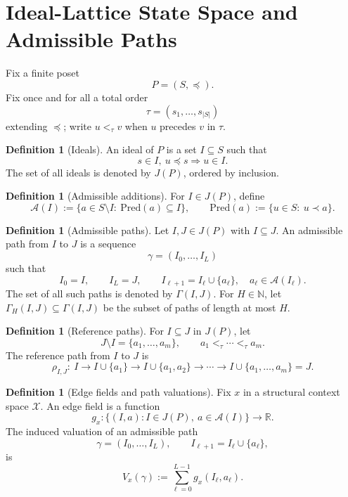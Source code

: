 \documentclass{article}
\theoremstyle{definition}
\newtheorem{definition}[theorem]{Definition}
\newcommand{\RR}{\mathbb R}
\begin{document}
\section{Ideal-Lattice State Space and Admissible Paths}
\label{sec:state-space}

Fix a finite poset
\[
P=(S,\preceq).
\]
Fix once and for all a total order
\[
\tau=(s_1,\dots,s_{|S|})
\]
extending \(\preceq\); write \(u<_{\tau}v\) when \(u\) precedes \(v\) in \(\tau\).

\begin{definition}[Ideals]
An {ideal} of \(P\) is a set \(I\subseteq S\) such that
\[
s\in I,\ u\preceq s \Longrightarrow u\in I.
\]
The set of all ideals is denoted by \(J(P)\), ordered by inclusion.
\end{definition}

\begin{definition}[Admissible additions]
For \(I\in J(P)\), define
\[
\mathcal A(I):=\{a\in S\setminus I:\ \mathrm{Pred}(a)\subseteq I\},
\qquad
\mathrm{Pred}(a):=\{u\in S:\ u\prec a\}.
\]
\end{definition}

\begin{definition}[Admissible paths]
Let \(I,J\in J(P)\) with \(I\subseteq J\). An {admissible path} from \(I\) to \(J\) is a sequence
\[
\gamma=(I_0,\dots,I_L)
\]
such that
\[
I_0=I,\qquad I_L=J,\qquad I_{\ell+1}=I_\ell\cup\{a_\ell\},\quad a_\ell\in \mathcal A(I_\ell).
\]
The set of all such paths is denoted by \(\Gamma(I,J)\). For \(H\in\mathbb N\), let \(\Gamma_H(I,J)\subseteq \Gamma(I,J)\) be the subset of paths of length at most \(H\).
\end{definition}

\begin{definition}[Reference paths]
For \(I\subseteq J\) in \(J(P)\), let
\[
J\setminus I=\{a_1,\dots,a_m\},
\qquad
a_1<_{\tau}\cdots<_{\tau} a_m.
\]
The {reference path} from \(I\) to \(J\) is
\[
\rho_{I,J}:\ 
I
\to I\cup\{a_1\}
\to I\cup\{a_1,a_2\}
\to \cdots \to
I\cup\{a_1,\dots,a_m\}=J.
\]
\end{definition}

\begin{definition}[Edge fields and path valuations]
Fix \(x\) in a structural context space \(\mathcal X\). An {edge field} is a function
\[
g_x:\{(I,a): I\in J(P),\ a\in \mathcal A(I)\}\to \RR.
\]
The induced valuation of an admissible path
\[
\gamma=(I_0,\dots,I_L),
\qquad
I_{\ell+1}=I_\ell\cup\{a_\ell\},
\]
is
\begin{equation}
\textstyle V_x(\gamma):=\sum_{\ell=0}^{L-1} g_x(I_\ell,a_\ell).
\label{eq:path-valuation}
\end{equation}
\end{definition}
\end{document}
